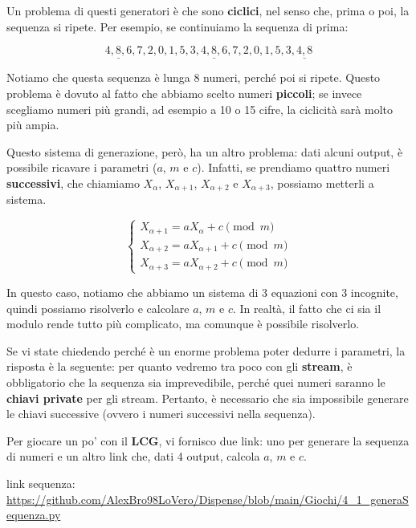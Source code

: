 \documentclass{rapport}
\begin{document}
Un problema di questi generatori è che sono \textbf{ciclici}, nel senso che, prima o poi, la sequenza si ripete.  
Per esempio, se continuiamo la sequenza di prima:


\begin{equation*}
    \underline{4, 8, 6}, 7, 2, 0, 1, 5, 3, \underline{4, 8, 6}, 7, 2, 0, 1, 5, 3, \underline{4, 8}
\end{equation*}


Notiamo che questa sequenza è lunga 8 numeri, perché poi si ripete.  
Questo problema è dovuto al fatto che abbiamo scelto numeri \textbf{piccoli}; se invece scegliamo numeri più grandi, ad esempio a 10 o 15 cifre, la ciclicità sarà molto più ampia.


Questo sistema di generazione, però, ha un altro problema: dati alcuni output, è possibile ricavare i parametri ($a$, $m$ e $c$).  
Infatti, se prendiamo quattro numeri \textbf{successivi}, che chiamiamo $X_{\alpha}$, $X_{\alpha+1}$, $X_{\alpha+2}$ e $X_{\alpha+3}$, possiamo metterli a sistema.


\begin{equation*}
    \begin{cases}
        X_{\alpha+1} = aX_{\alpha} + c \pmod{m} \\
        X_{\alpha+2} = aX_{\alpha+1} + c \pmod{m} \\
        X_{\alpha+3} = aX_{\alpha+2} + c \pmod{m}
    \end{cases}
\end{equation*}


In questo caso, notiamo che abbiamo un sistema di 3 equazioni con 3 incognite, quindi possiamo risolverlo e calcolare $a$, $m$ e $c$.  
In realtà, il fatto che ci sia il modulo rende tutto più complicato, ma comunque è possibile risolverlo.


Se vi state chiedendo perché è un enorme problema poter dedurre i parametri, la risposta è la seguente: per quanto vedremo tra poco con gli \textbf{stream}, è obbligatorio che la sequenza sia imprevedibile, perché quei numeri saranno le \textbf{chiavi private} per gli stream.  
Pertanto, è necessario che sia impossibile generare le chiavi successive (ovvero i numeri successivi nella sequenza).


Per giocare un po' con il \textbf{LCG}, vi fornisco due link: uno per generare la sequenza di numeri e un altro link che, dati 4 output, calcola $a$, $m$ e $c$.


\vspace{0.2cm}
link sequenza: \textcolor{maincolor}{\url{https://github.com/AlexBro98LoVero/Dispense/blob/main/Giochi/4_1_generaSequenza.py}}
\end{document}
